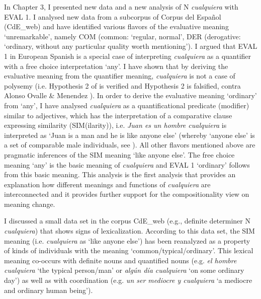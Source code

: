 \documentclass[output=paper]{langscibook}
\begin{document}
  In Chapter 3, I presented new data and a new analysis of N \textit{cualquiera} with EVAL 1. I analysed new data from a subcorpus of Corpus del Español (CdE\_web) and have identified various flavors of the evaluative meaning ‘unremarkable’, namely COM (common: ‘regular, normal’, DER (derogative: ‘ordinary, without any particular quality worth mentioning’). I argued that EVAL 1 in European Spanish is a special case of interpreting \textit{cualquiera} as a quantifier with a free choice interpretation ‘any’. I have shown that by deriving the evaluative meaning from the quantifier meaning, \textit{cualquiera} is not a case of polysemy (i.e. Hypothesis 2 of  is verified and Hypothesis 2 is falsified, contra Alonso Ovalle \& Menendez \citealt{Benito2018}). In order to derive the evaluative meaning ‘ordinary’ from ‘any’, I have analysed \textit{cualquiera} as a quantificational predicate (modifier) similar to adjectives, which has the interpretation of a comparative clause expressing similarity (SIM(ilarity)), i.e. \textit{Juan es un hombre cualquiera} is interpreted as ‘Juan is a man and he is like anyone else’ (whereby ‘anyone else’ is a set of comparable male individuals, see ). All other flavors mentioned above are pragmatic inferences of the SIM meaning ‘like anyone else’. The free choice meaning ‘any’ is the basic meaning of \textit{cualquiera} and EVAL 1 ‘ordinary’ follows from this basic meaning. This analysis is the first analysis that provides an explanation how different meanings and functions of \textit{cualquiera} are interconnected and it provides further support for the compositionality view on meaning change.

  I discussed a small data set in the corpus CdE\_web (e.g., definite determiner N \textit{cualquiera}) that shows signs of lexicalization. According to this data set, the SIM meaning (i.e. \textit{cualquiera} as ‘like anyone else’) has been reanalyzed as a property of kinds of individuals with the meaning ‘common/typical/ordinary’. This lexical meaning co-occurs with definite nouns and quantified nouns (e.g. \textit{el hombre cualquiera} ‘the typical person/man’ or \textit{algún día cualquiera} ‘on some ordinary day’) as well as with coordination (e.g. \textit{un ser mediocre y cualquiera} ‘a mediocre and ordinary human being’).
\end{document}
